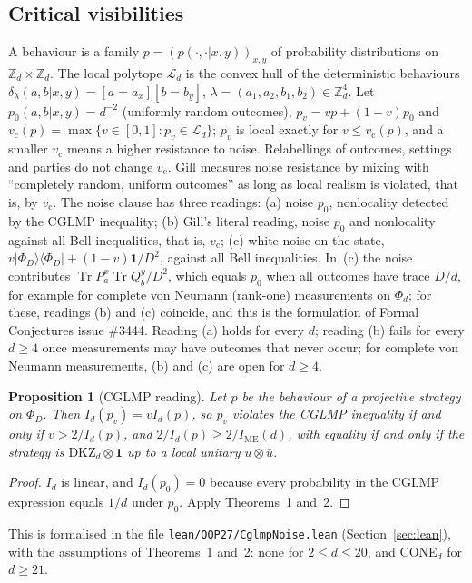 \documentclass[11pt]{amsart}
\newtheorem{proposition}[theorem]{Proposition}
\theoremstyle{definition}
\theoremstyle{remark}
\numberwithin{equation}{section}
\newcommand{\Z}{\mathbb{Z}}
\newcommand{\Tr}{\operatorname{Tr}}
\newcommand{\one}{\mathbf{1}}
\newcommand{\IME}{I_{\mathrm{ME}}}
\newcommand{\cL}{\mathcal{L}}
\newcommand{\vc}{v_{\mathrm c}}
\newcommand{\DKZ}{\mathrm{DKZ}}
\begin{document}
\subsection{Critical visibilities}
A behaviour is a family $p=(p(\cdot,\cdot|x,y))_{x,y}$ of probability distributions on $\Z_d\times\Z_d$. The local
polytope $\cL_d$ is the convex hull of the deterministic behaviours $\delta_\lambda(a,b|x,y)=[a=a_x][b=b_y]$,
$\lambda=(a_1,a_2,b_1,b_2)\in\Z_d^4$. Let $p_0(a,b|x,y)=d^{-2}$ (uniformly random outcomes), $p_v=vp+(1-v)p_0$ and
$\vc(p)=\max\{v\in[0,1]:p_v\in\cL_d\}$; $p_v$ is local exactly for $v\le\vc(p)$, and a smaller $\vc$ means a higher
resistance to noise. Relabellings of outcomes, settings and parties do not change $\vc$. Gill measures noise resistance
by mixing with ``completely random, uniform outcomes''\cite{Gill} as long as local realism is violated, that is, by
$\vc$. The noise clause has three readings: (a) noise $p_0$, nonlocality detected by the CGLMP inequality; (b) Gill's
literal reading, noise $p_0$ and nonlocality against all Bell inequalities, that is, $\vc$; (c) white noise on the
state, $v|\Phi_D\rangle\langle\Phi_D|+(1-v)\one/D^2$, against all Bell inequalities. In~(c) the noise contributes
$\Tr P^x_a\Tr Q^y_b/D^2$, which equals $p_0$ when all outcomes have trace $D/d$, for example for complete von Neumann
(rank-one) measurements on $\Phi_d$; for these, readings (b) and (c) coincide, and this is the formulation of Formal
Conjectures issue \#3444. Reading (a) holds for every $d$; reading (b) fails for every $d\ge4$ once measurements may have
outcomes that never occur; for complete von Neumann measurements, (b) and (c) are open for $d\ge4$.

\begin{proposition}[CGLMP reading]\label{prop:cglmpnoise}
Let $p$ be the behaviour of a projective strategy on $\Phi_D$. Then $I_d(p_v)=vI_d(p)$, so $p_v$ violates the CGLMP
inequality if and only if $v>2/I_d(p)$, and $2/I_d(p)\ge2/\IME(d)$, with equality if and only if the strategy is
$\DKZ_d\otimes\one$ up to a local unitary $u\otimes\bar u$.
\end{proposition}

\begin{proof}
$I_d$ is linear, and $I_d(p_0)=0$ because every probability in the CGLMP expression equals $1/d$ under $p_0$. Apply
Theorems~1 and~2.
\end{proof}

This is formalised in the file \texttt{lean/OQP27/CglmpNoise.lean} (Section~\ref{sec:lean}), with the assumptions of
Theorems~1 and~2: none for $2\le d\le20$, and CONE$_d$ for $d\ge21$.
\end{document}
